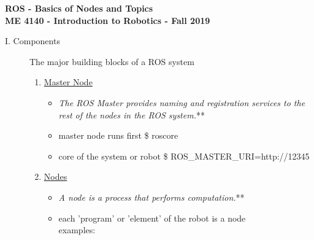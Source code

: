 \documentclass[12pt]{article}
\begin{document}
\thispagestyle{plain}

\begin{center}
   {\bf \Large ROS - Basics of Nodes and Topics}\vspace{2mm} \\
   {\bf \large ME 4140 - Introduction to Robotics - Fall 2019} \vspace{5mm}\\
\end{center}


\begin{description}

    \item [I. Components] The major building blocks of a ROS system

        \begin{enumerate}
                
            \item \href{http://wiki.ros.org/Master}{Master Node}
                \begin{itemize}
                    \item {\it The ROS Master provides naming and registration services to the rest of the nodes in the ROS system.}** 
                    \item master node runs first  {\selectfont  \hspace{5mm} \$ roscore } \\
                    \item core of the system or robot {\selectfont  \hspace{5mm} \$ ROS\_MASTER\_URI=http://12345 } \\
                    

                \end{itemize}
            
            \item \href{http://wiki.ros.org/Nodes}{Nodes}             
                \begin{itemize}
                    \item {\it A node is a process that performs computation.}** 
                    \item each 'program' or 'element' of the robot is a node\\examples:
                        \begin{itemize} 
                        \begin{multicols}{2}    
                        

\end{multicols}
\end{itemize}
\end{itemize}
\end{enumerate}
\end{description}
\end{document}

